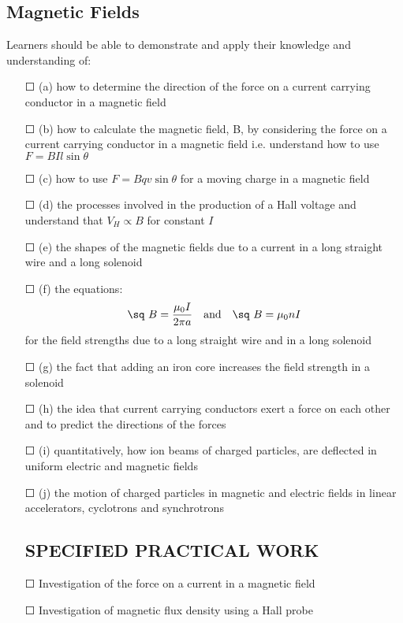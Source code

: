 \subsection{Magnetic Fields}Learners should be able to demonstrate and apply their knowledge and
understanding of:
\begin{itemize}
	\item[\Large{$\Square$}] (a) how to determine the direction of the force on a current carrying conductor in a magnetic field
	\item[\Large{$\Square$}]	(b) how to calculate the magnetic field, B, by considering the force on a current carrying conductor in a magnetic field i.e. understand how to use \( F=BIl \sin \theta \)
	\item[\Large{$\Square$}]	(c) how to use \(F=Bqv \sin \theta \) for a moving charge in a magnetic field
	\item[\Large{$\Square$}]	(d) the processes involved in the production of a Hall voltage and \sq understand that \( V_{H} \propto B\) for constant \(I\)
	\item[\Large{$\Square$}]	(e) the shapes of the magnetic fields due to a current in \sq a long straight wire and \sq a	long solenoid
	\item[\Large{$\Square$}]	(f) the equations:
	\begin{align*}
	\text{\sq } B= \frac{\mu_{0} I}{2 \pi a} && \text{and} && \text{\sq } B= \mu_{0} nI
	\end{align*} for the field strengths due to a long straight wire and in a long solenoid
	\item[\Large{$\Square$}]	(g) the fact that adding an iron core increases the field strength in a solenoid
	\item[\Large{$\Square$}]	(h) the idea that current carrying conductors exert a force on each other and \sq to predict the directions of the forces
	\item[\Large{$\Square$}]	(i) quantitatively, how ion beams of charged particles, are deflected in uniform \sq electric and \sq magnetic fields
	\item[\Large{$\Square$}]	(j) the motion of charged particles in magnetic and electric fields in linear accelerators, \sq cyclotrons and \sq synchrotrons
	\subsection*{SPECIFIED PRACTICAL WORK}
	\item[\Large{$\Square$}] Investigation of the force on a current in a magnetic field
	\item[\Large{$\Square$}] Investigation of magnetic flux density using a Hall probe
\end{itemize}
